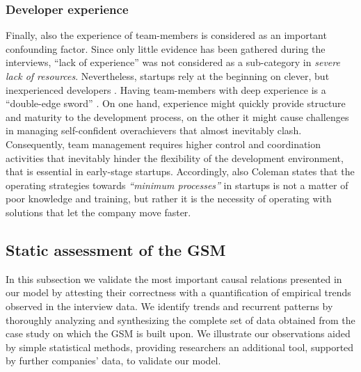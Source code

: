 \documentclass[10pt,journal,letterpaper,compsoc]{IEEEtran}
\begin{document}
\subsubsection{Developer experience} 
Finally, also the experience of team-members is considered as an important confounding factor. Since only little evidence has been gathered during the interviews, ``lack of experience'' was not considered as a sub-category in \textit{severe lack of resources}. Nevertheless, startups rely at the beginning on clever, but inexperienced developers \cite{Crowne2002}. Having team-members with deep experience is a ``double-edge sword'' \cite{Yoffie1999}. On one hand, experience might quickly provide structure and maturity to the development process, on the other it might cause challenges in managing self-confident overachievers that almost inevitably clash. Consequently, team management requires higher control and coordination activities that inevitably hinder the flexibility of the development environment, that is essential in early-stage startups. Accordingly, also Coleman \cite{Coleman2007,
Coleman2008a,Coleman2008} states that the operating strategies towards \textit{``minimum processes''} in startups is not a matter of poor knowledge and training, but rather it is the necessity of operating with solutions that let the company move faster.


\subsection{Static assessment of the GSM}
\label{sect:theory:validation:stats}

In this subsection we validate the most important causal relations presented in our model by attesting their correctness  with a quantification of empirical trends observed in the interview data. We identify trends and recurrent patterns by thoroughly analyzing and synthesizing the complete set of data obtained from the case study on which the GSM is built upon. We illustrate our observations aided by simple statistical methods, providing researchers an additional tool, supported by further companies' data, to validate our model.
\end{document}
